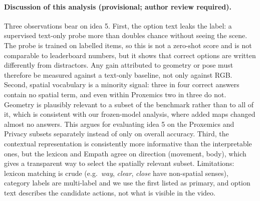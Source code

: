 \paragraph{Discussion of this analysis (provisional; author review required).} Three observations bear on idea 5. First, the option text leaks the label: a supervised text-only probe more than doubles chance without seeing the scene. The probe is trained on labelled items, so this is not a zero-shot score and is not comparable to leaderboard numbers, but it shows that correct options are written differently from distractors. Any gain attributed to geometry or pose must therefore be measured against a text-only baseline, not only against RGB. Second, spatial vocabulary is a minority signal: three in four correct answers contain no spatial term, and even within Proxemics two in three do not. Geometry is plausibly relevant to a subset of the benchmark rather than to all of it, which is consistent with our frozen-model analysis, where added maps changed almost no answers. This argues for evaluating idea 5 on the Proxemics and Privacy subsets separately instead of only on overall accuracy. Third, the contextual representation is consistently more informative than the interpretable ones, but the lexicon and Empath agree on direction (movement, body), which gives a transparent way to select the spatially relevant subset. Limitations: lexicon matching is crude (e.g.\ \emph{way}, \emph{clear}, \emph{close} have non-spatial senses), category labels are multi-label and we use the first listed as primary, and option text describes the candidate actions, not what is visible in the video.

